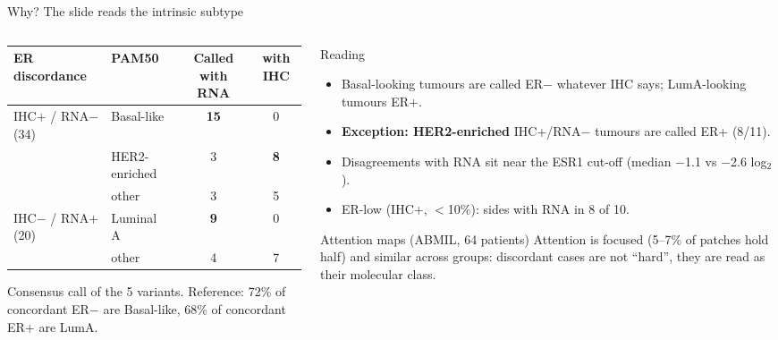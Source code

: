 \documentclass[aspectratio=169,10pt]{beamer}
\begin{document}
\begin{frame}[t]{Why? The slide reads the intrinsic subtype}
\footnotesize
\begin{columns}[T]
\begin{column}{0.50\textwidth}
\centering
\scriptsize
\begin{tabular}{llcc}
\toprule
ER discordance & PAM50 & Called with RNA & with IHC \\
\midrule
IHC+ / RNA$-$ (34) & Basal-like & \textbf{15} & 0 \\
 & HER2-enriched & 3 & \textbf{8} \\
 & other & 3 & 5 \\
\midrule
IHC$-$ / RNA+ (20) & Luminal A & \textbf{9} & 0 \\
 & other & 4 & 7 \\
\bottomrule
\end{tabular}

\vspace{4pt}
{\tiny Consensus call of the 5 variants. Reference: 72\% of concordant ER$-$ are Basal-like, 68\% of concordant ER+ are LumA.}
\end{column}
\begin{column}{0.46\textwidth}
\begin{block}{Reading}
\begin{itemize}
  \item Basal-looking tumours are called ER$-$ whatever IHC says; LumA-looking tumours ER+.
  \item \textbf{Exception: HER2-enriched} IHC+/RNA$-$ tumours are called ER+ (8/11).
  \item Disagreements with RNA sit near the ESR1 cut-off (median $-$1.1 vs $-$2.6 log$_2$).
  \item ER-low (IHC+, $<$10\%): sides with RNA in 8 of 10.
\end{itemize}
\end{block}
\begin{alertblock}{Attention maps (ABMIL, 64 patients)}
Attention is focused (5--7\% of patches hold half) and similar across groups: discordant cases are not ``hard'',
they are read as their molecular class.
\end{alertblock}
\end{column}
\end{columns}
\end{frame}
\end{document}
